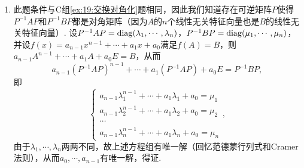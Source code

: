 \begin{enumerate}
    \item 此题条件与C组\ref*{ex:19:交换对角化}题相同，因此我们知道存在可逆矩阵$P$使得$P^{-1}AP$和$P^{-1}BP$都是对角矩阵（因为$A$的$n$个线性无关特征向量也是$B$的线性无关特征向量）. 设$P^{-1}AP=\operatorname{diag}(\lambda_1,\cdots,\lambda_n)$，$P^{-1}BP=\operatorname{diag}(\mu_1,\cdots,\mu_n)$，并设$f(x)=a_{n-1}x^{n-1}+\cdots+a_1x+a_0$满足$f(A)=B$，则$a_{n-1}A^{n-1}+\cdots+a_1A+a_0E=B$，从而
    \[a_{n-1}(P^{-1}AP)^{n-1}+\cdots+a_1(P^{-1}AP)+a_0E=P^{-1}BP,\]
    即
    \[\begin{cases}
        a_{n-1}\lambda_1^{n-1}+\cdots+a_1\lambda_1+a_0=\mu_1 \\
        a_{n-1}\lambda_2^{n-1}+\cdots+a_1\lambda_2+a_0=\mu_2 \\
        \cdots \\
        a_{n-1}\lambda_n^{n-1}+\cdots+a_1\lambda_n+a_0=\mu_n
    \end{cases},\]
    由于$\lambda_1,\cdots,\lambda_n$两两不同，故上述方程组有唯一解（回忆范德蒙行列式和Cramer法则），从而$a_0,\cdots,a_{n-1}$有唯一解，得证.
\end{enumerate}

\clearpage
